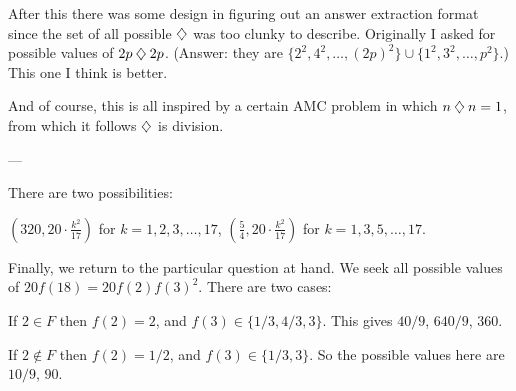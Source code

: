 After this there was some design in figuring out an answer extraction
format since the set of all possible $\mathbin{\diamondsuit}$ was too clunky to describe.
Originally I asked for possible values of $2p \mathbin{\diamondsuit} 2p$.
(Answer: they are $\{2^2, 4^2, \dots, (2p)^2\} \cup \{ 1^2, 3^2, \dots, p^2 \}$.)
This one I think is better.

And of course, this is all inspired by a certain AMC problem
in which $n \mathbin{\diamondsuit} n = 1$, from which it follows $\mathbin{\diamondsuit}$ is division.

---



There are two possibilities:
\begin{itemize}
  \ii $(320, 20 \cdot \frac{k^2}{17})$ for $k = 1, 2, 3, \dots, 17$,
  \ii $(\frac54, 20 \cdot \frac{k^2}{17})$ for $k = 1, 3, 5, \dots, 17$.
\end{itemize}

Finally, we return to the particular question at hand.
We seek all possible values of $20f(18) = 20f(2)f(3)^2$.
There are two cases:
\begin{itemize}
  \ii If $2 \in F$ then $f(2) = 2$, and $f(3) \in \{1/3, 4/3,  3\}$.
  This gives $40/9$, $640/9$, $360$.

  \ii If $2 \notin F$ then $f(2) = 1/2$, and $f(3) \in \{1/3,3\}$.
  So the possible values here are $10/9$, $90$.
\end{itemize}
